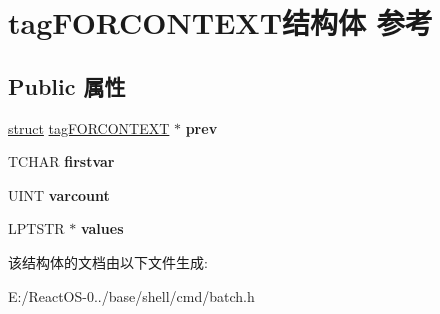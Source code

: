 \hypertarget{structtag_f_o_r_c_o_n_t_e_x_t}{}\section{tag\+F\+O\+R\+C\+O\+N\+T\+E\+X\+T结构体 参考}
\label{structtag_f_o_r_c_o_n_t_e_x_t}
\subsection*{Public 属性}
\begin{DoxyCompactItemize}
\item 
\mbox{\label{structtag_f_o_r_c_o_n_t_e_x_t_a00e1b425008865581178ec47c3aac4ed}} 
\hyperlink{interfacestruct}{struct} \hyperlink{structtag_f_o_r_c_o_n_t_e_x_t}{tag\+F\+O\+R\+C\+O\+N\+T\+E\+XT} $\ast$ {\bfseries prev}
\item 
\mbox{\label{structtag_f_o_r_c_o_n_t_e_x_t_a03183a81b3d111a4bc326e3657a9537c}} 
T\+C\+H\+AR {\bfseries firstvar}
\item 
\mbox{\label{structtag_f_o_r_c_o_n_t_e_x_t_aa9ee315aee584e6d00347179f693cf9a}} 
U\+I\+NT {\bfseries varcount}
\item 
\mbox{\label{structtag_f_o_r_c_o_n_t_e_x_t_a173a00db040a42dbc25ba2b0910324c7}} 
L\+P\+T\+S\+TR $\ast$ {\bfseries values}
\end{DoxyCompactItemize}


该结构体的文档由以下文件生成\+:\begin{DoxyCompactItemize}
\item 
E\+:/\+React\+O\+S-\/0../base/shell/cmd/batch.\+h\end{DoxyCompactItemize}
